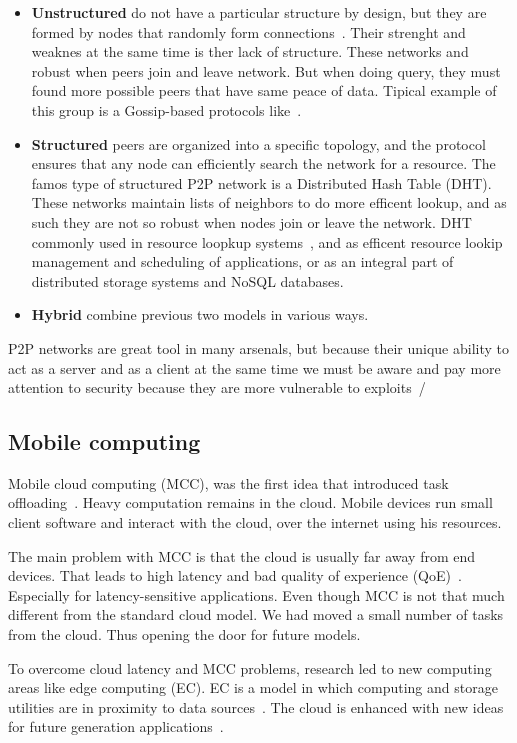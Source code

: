 \begin{itemize}
	\item \textbf{Unstructured} do not have a particular structure by design, but they are formed by nodes that randomly form connections~\cite{FilaliBHB11}. Their strenght and weaknes at the same time is ther lack of structure. These networks and robust when peers join and leave network. But when doing query, they must found more possible peers that have same peace of data. Tipical example of this group is a Gossip-based protocols like~\cite{DasGM02}.
	\item \textbf{Structured} peers are organized into a specific topology, and the protocol ensures that any node can efficiently search the network for a resource. The famos type of structured P2P network is a Distributed Hash Table (DHT). These networks maintain lists of neighbors to do more efficent lookup, and as such they are not so robust when nodes join or leave the network. DHT commonly used in resource loopkup systems~\cite{StoicaMKKB01}, and as efficent resource lookip management and scheduling of applications, or as an integral part of distributed storage systems and NoSQL\cite{Leavitt10} databases.
	\item \textbf{Hybrid} combine previous two models in various ways.
\end{itemize}

P2P networks are great tool in many arsenals, but because their unique ability to act as a server and as a client at the same time we must be aware and pay more attention to security because they are more vulnerable to exploits~\cite{0024003}/
%
%
\subsection{Mobile computing}\label{sec:mobile_computing}
%
Mobile cloud computing (MCC), was the first idea that introduced task offloading~\cite{FernandoLR13, LinLJL19}. Heavy computation remains in the cloud. Mobile devices run small client software and interact with the cloud, over the internet using his resources. 

The main problem with MCC is that the cloud is usually far away from end devices. That leads to high latency and bad quality of experience (QoE)~\cite{LinLJL19}. Especially for latency-sensitive applications. Even though MCC is not that much different from the standard cloud model. We had moved a small number of tasks from the cloud. Thus opening the door for future models.

To overcome cloud latency and MCC problems, research led to new computing areas like edge computing (EC). EC is a model in which computing and storage utilities are in proximity to data sources~\cite{Satyanarayanan17}. The cloud is enhanced with new ideas for future generation applications~\cite{NingLSY20}. 

